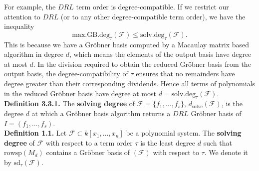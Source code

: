 \documentclass[11pt]{article}
\newcommand{\sdeg}{\text{solv.deg}}
\newcommand{\mdeg}{\text{max.GB.deg}}
\begin{document}
For example, the $DRL$ term order is degree-compatible. If we restrict our attention to $DRL$ (or to any other degree-compatible term order), we have the inequality \[\mdeg_\tau(\mathcal{F}) \leq \sdeg_\tau(\mathcal{F}).\] This is because we have a Gröbner basis computed by a Macaulay matrix based algorithm in degree $d$, which means the elements of the output basis have degree at most $d$. In the division required to obtain the reduced Gröbner basis from the output basis, the degree-compatibility of $\tau$ ensures that no remainders have degree greater than their corresponding dividends. Hence all terms of polynomials in the reduced Gröbner basis have degree at most $d = \sdeg_\tau(\mathcal{F})$. \\

\noindent \textbf{\cite{minko2021security} Definition 3.3.1.} The \textbf{solving degree} of $\mathcal{F} = \{f_1, \dots, f_s\}$, $d_{\text{solve}}(\mathcal{F})$, is the degree $d$ at which a Gröbner basis algorithm returns a $DRL$ Gröbner basis of $I = (f_1, \dots, f_s)$. \\

\noindent \textbf{\cite{caminata2023solving} Definition 1.1.} Let $\mathcal{F} \subset k[x_1, \dots, x_n]$ be a polynomial system. The \textbf{solving degree} of $\mathcal{F}$ with respect to a term order $\tau$ is the least degree $d$ such that $\text{rowsp}(M_d)$ contains a Gröbner basis of $(\mathcal{F})$ with respect to $\tau$. We denote it by $\text{sd}_\tau(\mathcal{F})$. \\
\end{document}

